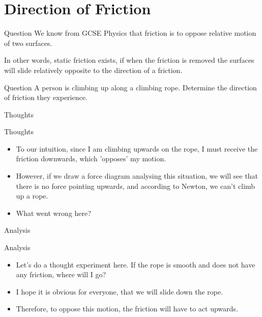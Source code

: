 \documentclass{beamer}
\begin{document}
    \section{Direction of Friction}

    \begin{frame}{Question}
        We know from GCSE Physics that friction is to oppose relative motion of two surfaces.

        In other words, static friction exists, if when the friction is removed the surfaces will slide relatively opposite to the direction of a friction.

        \begin{block}{Question}
            A person is climbing up along a climbing rope. Determine the direction of friction they experience.
        \end{block}
    \end{frame}

    \begin{frame}{Thoughts}
        \begin{exampleblock}{Thoughts}
            \begin{itemize}
                \item To our intuition, since I am climbing upwards on the rope, I must receive the friction downwards, which 'opposes' my motion. \pause

                \item However, if we draw a force diagram analysing this situation, we will see that there is \alert{no force pointing upwards}, and according to Newton, we can't climb up a rope. \pause

                \item \alert{What went wrong here?}
            \end{itemize}
        \end{exampleblock}
    \end{frame}

    \begin{frame}{Analysis}
        \begin{exampleblock}{Analysis}
            \begin{itemize}
                \item Let's do a thought experiment here. If the rope is smooth and does not have any friction, where will I go? \pause
                \item I hope it is obvious for everyone, that we will slide down the rope. \pause
                \item Therefore, to oppose this motion, the friction will have to act upwards.
            \end{itemize}
        \end{exampleblock}
    \end{frame}
\end{document}

